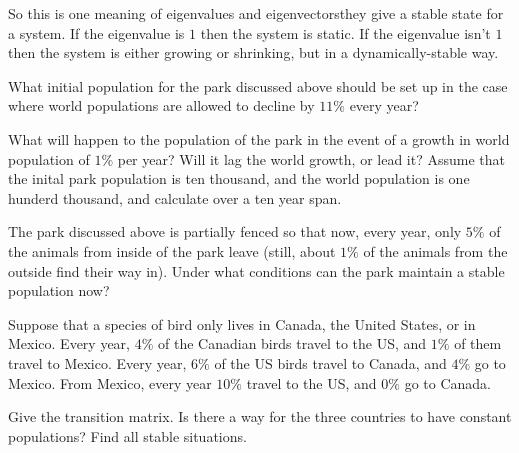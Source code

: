So this is one meaning of eigenvalues and eigenvectors\Dash they give a 
stable state for a system.
If the eigenvalue is $1$ then the system is static.
If the eigenvalue isn't $1$ then the system is either growing or
shrinking, but in a dynamically-stable way.





\begin{exercises}
  \item 
    What initial population for the park discussed above
    should be set up in the
    case where world populations are allowed to decline by $11\%$ every year?
  \item 
    What will happen to the population of the park in the event of
    a growth in world population of $1\%$ per year?
    Will it lag the world growth, or lead it?
    Assume that the inital park population is ten thousand, and the
    world population is one hunderd thousand, 
    and calculate over a ten year span.
  \item 
    The park discussed above is partially fenced so that now,
    every year, only $5\%$ of the animals from inside of the park leave (still,
    about $1\%$ of the animals from the outside 
    find their way in).
    Under what conditions can the park maintain a stable population now?
  \item 
    Suppose that a species of bird only lives in Canada, the United States,
    or in Mexico.
    Every year, $4\%$ of the Canadian birds travel to the US, and $1\%$ of them
    travel to Mexico.
    Every year, $6\%$ of the US birds travel to Canada, and $4\%$ go to Mexico.
    From Mexico, every year $10\%$ travel to the US, and $0\%$ go to Canada.
    \begin{exparts}
      \partsitem Give the transition matrix.
      \partsitem Is there a way for the three countries to have constant
         populations?
      \partsitem Find all stable situations.   
    \end{exparts}
\end{exercises}
\endinput






